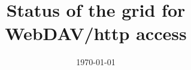 \documentclass[a4paper,10pt,fleqn]{article}
\begin{document}
\title{Status of the grid for WebDAV/http access} %

\date{\today}
\maketitle





%
%




\end{document}

